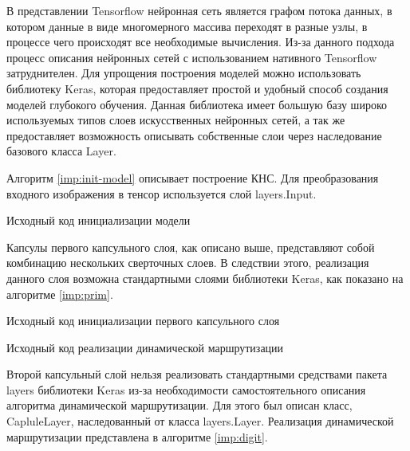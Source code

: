 В представлении Tensorflow нейронная сеть является графом потока данных, в котором данные в виде многомерного массива переходят в разные узлы, в процессе чего происходят все необходимые вычисления. Из-за данного подхода процесс описания нейронных сетей с использованием нативного Tensorflow затруднителен. Для упрощения построения моделей можно использовать библиотеку Keras, которая предоставляет простой и удобный способ создания моделей глубокого обучения. Данная библиотека имеет большую базу широко используемых типов слоев искусственных нейронных сетей, а так же предоставляет возможность описывать собственные слои через наследование базового класса Layer.

Алгоритм \ref{imp:init-model} описывает построение КНС. Для преобразования входного изображения в тенсор используется слой layers.Input.

\begin{minipage}{0.8\textwidth}
	\begin{algorithm}[H]
		
		\caption{Исходный код инициализации модели}
		\label{imp:init-model}
	\end{algorithm}
\end{minipage}

Капсулы первого капсульного слоя, как описано выше, представляют собой комбинацию нескольких сверточных слоев. В следствии этого, реализация данного слоя возможна стандартными слоями библиотеки Keras, как показано на алгоритме \ref{imp:prim}.

\begin{minipage}{0.8\textwidth}
	\begin{algorithm}[H]
		
		\caption{Исходный код инициализации первого капсульного слоя}
		\label{imp:prim}
	\end{algorithm}
\end{minipage}


\begin{minipage}{0.8\textwidth}
	\begin{algorithm}[H]
		
		\caption{Исходный код реализации динамической маршрутизации}
		\label{imp:digit}
	\end{algorithm}
\end{minipage}

Второй капсульный слой нельзя реализовать стандартными средствами пакета layers библиотеки Keras из-за необходимости самостоятельного описания алгоритма динамической маршрутизации. Для этого был описан класс, CapluleLayer, наследованный от класса layers.Layer. Реализация динамической маршрутизации представлена в алгоритме \ref{imp:digit}.

